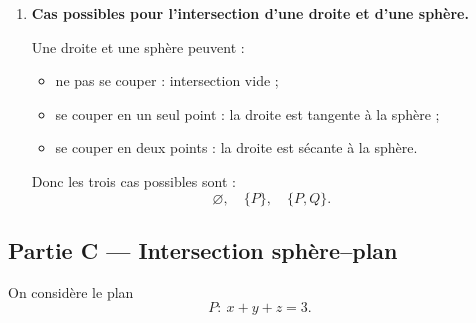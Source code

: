 \documentclass[11pt,a4paper]{article}
\newcommand{\Sphere}{\mathcal{S}}
\begin{document}
\begin{enumerate}[label=\textbf{\arabic*.},resume]
    Finalement
    \[
    \boxed{\Delta'\cap \Sphere=\left\{(1,4,1)\right\}.}
    \]

    \item \textbf{Cas possibles pour l'intersection d'une droite et d'une sphère.}

    Une droite et une sphère peuvent :
    \begin{itemize}
        \item ne pas se couper : intersection vide ;
        \item se couper en un seul point : la droite est tangente à la sphère ;
        \item se couper en deux points : la droite est sécante à la sphère.
    \end{itemize}

    Donc les trois cas possibles sont :
    \[
    \boxed{\varnothing,\quad \{P\},\quad \{P,Q\}.}
    \]
\end{enumerate}

\subsection*{Partie C --- Intersection sphère--plan}

On considère le plan
\[
P:\ x+y+z=3.
\]
\end{document}

